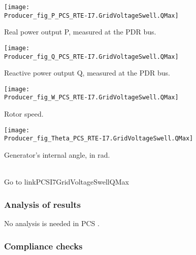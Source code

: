     \vspace{0.5cm}

    \noindent
    \begin{minipage}[t]{0.48\textwidth}
        \centering
        \texttt{[image: \\Producer\_fig\_P\_PCS\_RTE-I7.GridVoltageSwell.QMax]}
        \begin{minipage}[t]{0.8\textwidth}
            \small Real power output P, measured at the PDR bus.
        \end{minipage}
    \end{minipage}
    \hfill
    \begin{minipage}[t]{0.48\textwidth}
        \centering
        \texttt{[image: \\Producer\_fig\_Q\_PCS\_RTE-I7.GridVoltageSwell.QMax]}
        \begin{minipage}[t]{0.8\textwidth}
            \small Reactive power output Q, measured at the PDR bus.
        \end{minipage}
    \end{minipage}

    \vspace{0.5cm}

    \noindent
    \begin{minipage}[t]{0.48\textwidth}
        \centering
        \texttt{[image: \\Producer\_fig\_W\_PCS\_RTE-I7.GridVoltageSwell.QMax]}
        \begin{minipage}[t]{0.8\textwidth}
            \small Rotor speed.
        \end{minipage}
    \end{minipage}
    \hfill
    \begin{minipage}[t]{0.48\textwidth}
        \centering
        \texttt{[image: \\Producer\_fig\_Theta\_PCS\_RTE-I7.GridVoltageSwell.QMax]}
        \begin{minipage}[t]{0.8\textwidth}
            \small Generator's internal angle, in rad.
        \end{minipage}
    \end{minipage}
    \\[2\baselineskip]
    Go to  {{ linkPCSI7GridVoltageSwellQMax }}


    \subsubsection{Analysis of results}

    \noindent No analysis is needed in PCS \DTRPcs.


    \subsubsection{Compliance checks}

